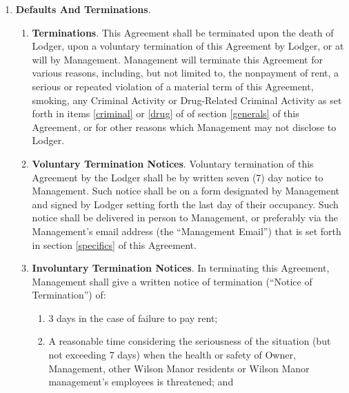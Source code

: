 \documentclass[12pt,letterpaper]{article}
\newcommand{\lodger}{Lodger}
\newcommand{\management}{Management}
\newcommand{\myemail}{Management Email}
\newcommand{\condo}{Wilson Manor}
\newcommand{\apt}{Apartment}
\newcommand{\room}{Room}
\begin{document}
\begin{enumerate}
\begin{enumerate}
			\item \textbf{Alterations}. To make no repairs, alterations or additions of any kind without the prior written consent of \management{}, including but not limited to, painting, changing locks, or installing security bars, doors or safety devices. \management{} may withhold such consent at \management{}'s sole discretion. 
			\item \textbf{Signs}. Not to display on or about the \room{}, \apt{}, or \condo{} any signs or advertisements of any kind including, but not limited to, signs for goods or services. 
		\end{enumerate}
	\item \textbf{Defaults And Terminations}. 
		\begin{enumerate}
			\item \textbf{Terminations}. 
				This Agreement shall be terminated upon the death of \lodger{}, upon a voluntary termination of this Agreement by \lodger{}, or at will by \management{}. \management{} will terminate this Agreement for various reasons, including, but not limited to, the nonpayment of rent, a serious or repeated violation of a material term of this Agreement, smoking, any Criminal Activity or Drug-Related Criminal Activity as set forth in items \ref{criminal} or \ref{drug} of of section \ref{generals} of this Agreement, or for other reasons which \management{} may not disclose to \lodger{}.
			\item \textbf{Voluntary Termination Notices}. 
				Voluntary termination of this Agreement by the \lodger{} shall be by written seven (7) day notice to \management{}. Such notice shall be on a form designated by \management{} and signed by \lodger{} setting forth the last day of their occupancy. Such notice shall be delivered in person to \management{}, or preferably via the \management{}'s email address (the ``\myemail{}'') that is set forth in section \ref{specifics} of this Agreement{}. 
			\item \textbf{Involuntary Termination Notices}. \label{terminate}
				In terminating this Agreement, \management{} shall give a written notice of termination (``Notice of Termination'') of: 
				\begin{enumerate}
					\item 3 days in the case of failure to pay rent; 
					\item A reasonable time considering the seriousness of the situation (but not exceeding 7 days) when the health or safety of Owner, \management{}, other \condo{} residents or \condo{} management's employees is threatened; and 

\end{enumerate}
\end{enumerate}
\end{enumerate}
\end{document}

